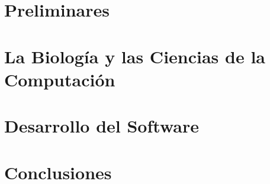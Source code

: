 \documentclass[a4paper,10pt]{report}
\theoremstyle{definition}
\begin{document}








\tableofcontents

\part{Preliminares}


\part{La Biolog\'ia y las Ciencias de la Computaci\'on}




\part{Desarrollo del Software}
\label{software}






\part{Conclusiones}


\cleardoublepage



\appendix

\end{document}
